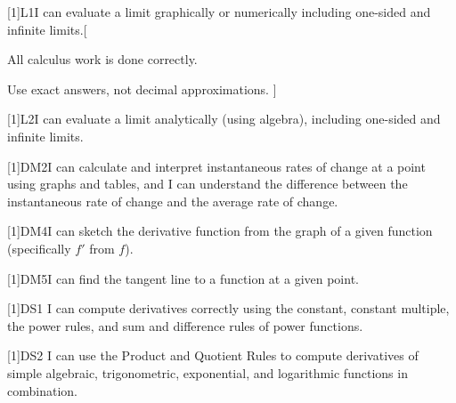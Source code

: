 [1]{L1}{I can evaluate a limit graphically or numerically including one-sided and infinite limits.}[
    \item All calculus work is done correctly. \item Use exact answers, not decimal approximations.
]

[1]{L2}{I can evaluate a limit analytically (using algebra), including one-sided and infinite limits.}






[1]{DM2}{I can calculate and interpret instantaneous rates of
  change at a point using graphs and tables, and I can understand the difference
  between the instantaneous rate of change and the average rate of change.}


[1]{DM4}{I can sketch the derivative function from the graph of a
given function (specifically $f'$ from $f$).}


[1]{DM5}{I can find the tangent line to a function at a given
point.}





[1]{DS1}{%
I can compute derivatives correctly using the constant, constant multiple, the
power rules, and sum and difference rules of power functions.
}

[1]{DS2}{%
I can use the Product and Quotient Rules to compute derivatives of simple algebraic, trigonometric, exponential, and logarithmic functions in combination.
}


